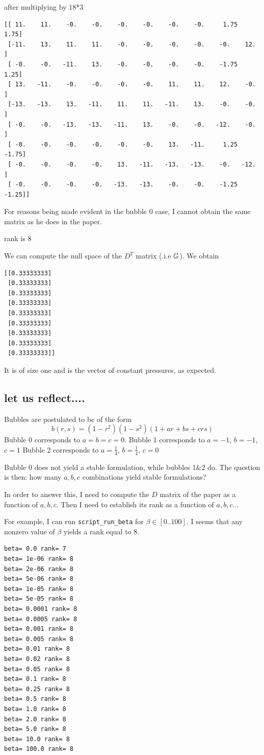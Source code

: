after multiplying by 18*3
\begin{verbatim}
[[ 11.    11.    -0.    -0.    -0.    -0.    -0.    -0.     1.75   1.75]
 [-11.    13.    11.    11.    -0.    -0.    -0.    -0.    -0.    12.  ]
 [ -0.    -0.   -11.    13.    -0.    -0.    -0.    -0.    -1.75   1.25]
 [ 13.   -11.    -0.    -0.    -0.    -0.    11.    11.    12.    -0.  ]
 [-13.   -13.    13.   -11.    11.    11.   -11.    13.    -0.    -0.  ]
 [ -0.    -0.   -13.   -13.   -11.    13.    -0.    -0.   -12.    -0.  ]
 [ -0.    -0.    -0.    -0.    -0.    -0.    13.   -11.     1.25  -1.75]
 [ -0.    -0.    -0.    -0.    13.   -11.   -13.   -13.    -0.   -12.  ]
 [ -0.    -0.    -0.    -0.   -13.   -13.    -0.    -0.    -1.25  -1.25]]
\end{verbatim}

For reasons being made evident in the bubble 0 case, I cannot obtain the same 
matrix as he does in the paper. 

rank is 8

We can compute the null space of the $D^T$ matrix (.i.e ${\mathbb{G}}$).
We obtain
\begin{verbatim}
[[0.33333333]
 [0.33333333]
 [0.33333333]
 [0.33333333]
 [0.33333333]
 [0.33333333]
 [0.33333333]
 [0.33333333]
 [0.33333333]]
\end{verbatim}
It is of size one and is the vector of constant pressures, as expected.




\newpage
\subsection*{let us reflect....}

Bubbles are postulated to be of the form
\[
b(r,s) = (1-r^2)(1-s^2) (1 + ar + bs + crs  )
\]
Bubble 0 corresponds to $a=b=c=0$. 
Bubble 1 corresponds to $a=-1$, $b=-1$, $c=1$
Bubble 2 corresponds to $a=\frac14$, $b=\frac14$, $c=0$

Bubble 0 does not yield a stable formulation, while bubbles 1\&2 do. 
The question is then: how many $a,b,c$ combinations yield stable formulations?

In order to answer this, I need to compute the $D$ matrix of the paper
as a function of $a,b,c$. Then I need to establish its rank as a function of $a,b,c$...

For example, I can run {\tt script\_run\_beta} for $\beta\in [0..100]$. 
I seems that any nonzero value of $\beta$ yields a rank equal to 8.
\begin{verbatim}
beta= 0.0 rank= 7
beta= 1e-06 rank= 8
beta= 2e-06 rank= 8
beta= 5e-06 rank= 8
beta= 1e-05 rank= 8
beta= 5e-05 rank= 8
beta= 0.0001 rank= 8
beta= 0.0005 rank= 8
beta= 0.001 rank= 8
beta= 0.005 rank= 8
beta= 0.01 rank= 8
beta= 0.02 rank= 8
beta= 0.05 rank= 8
beta= 0.1 rank= 8
beta= 0.25 rank= 8
beta= 0.5 rank= 8
beta= 1.0 rank= 8
beta= 2.0 rank= 8
beta= 5.0 rank= 8
beta= 10.0 rank= 8
beta= 100.0 rank= 8
\end{verbatim}


